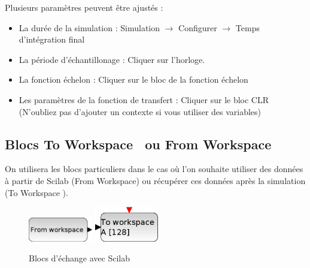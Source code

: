 Plusieurs paramètres peuvent être ajustés :
\begin{itemize}
    \item La durée de la simulation : Simulation $\rightarrow$ 
          Configurer $\rightarrow$ Temps d'intégration final
    \item La période d'échantillonage : Cliquer sur l'horloge.
    \item La fonction échelon  : Cliquer sur le bloc de la fonction échelon
    \item Les paramètres de la fonction de transfert : Cliquer sur le bloc CLR 
          (N'oubliez pas d'ajouter un contexte si vous utiliser des variables)
\end{itemize}

\subsection{Blocs \og To Workspace \fg~ou \og From Workspace\fg}
On utilisera les blocs particuliers dans le cas où l'on souhaite 
utiliser des données à partir de Scilab (\og From Workspace\fg) 
ou récupérer ces données après la simulation (\og To Workspace \fg).
\begin{figure}[!h]
    \centering
    \includegraphics[width=0.25\textwidth]{fig/FROMWSB.eps}\hspace{3cm}
    \includegraphics[width=0.25\textwidth]{fig/TOWS_c.eps}
    \caption{Blocs d'échange avec Scilab\label{fig-workspace}}
\end{figure}
\newpage
